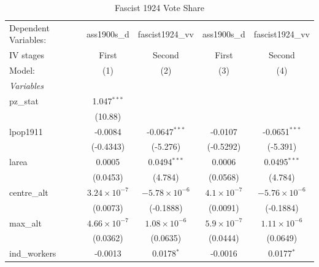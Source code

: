 
\begin{table}[htbp]
   \caption{Fascist 1924 Vote Share}
   \centering
   \begin{tabular}{lcccc}
      \tabularnewline \midrule \midrule
      Dependent Variables:             & ass1900s\_d           & fascist1924\_vv        & ass1900s\_d          & fascist1924\_vv\\   
      IV stages                        & First                 & Second                 & First                & Second \\   
      Model:                           & (1)                   & (2)                    & (3)                  & (4)\\  
      \midrule
      \emph{Variables}\\
      pz\_stat                         & 1.047$^{***}$         &                        &                      &   \\   
                                       & (10.88)               &                        &                      &   \\   
      lpop1911                         & -0.0084               & -0.0647$^{***}$        & -0.0107              & -0.0651$^{***}$\\   
                                       & (-0.4343)             & (-5.276)               & (-0.5292)            & (-5.391)\\   
      larea                            & 0.0005                & 0.0494$^{***}$         & 0.0006               & 0.0495$^{***}$\\   
                                       & (0.0453)              & (4.784)                & (0.0568)             & (4.784)\\   
      centre\_alt                      & $3.24\times 10^{-7}$  & $-5.78\times 10^{-6}$  & $4.1\times 10^{-7}$  & $-5.76\times 10^{-6}$\\    
                                       & (0.0073)              & (-0.1888)              & (0.0091)             & (-0.1884)\\   
      max\_alt                         & $4.66\times 10^{-7}$  & $1.08\times 10^{-6}$   & $5.9\times 10^{-7}$  & $1.11\times 10^{-6}$\\    
                                       & (0.0362)              & (0.0635)               & (0.0444)             & (0.0649)\\   
      ind\_workers                     & -0.0013               & 0.0178$^{*}$           & -0.0016              & 0.0177$^{*}$\\   

\end{tabular}
\end{table}
